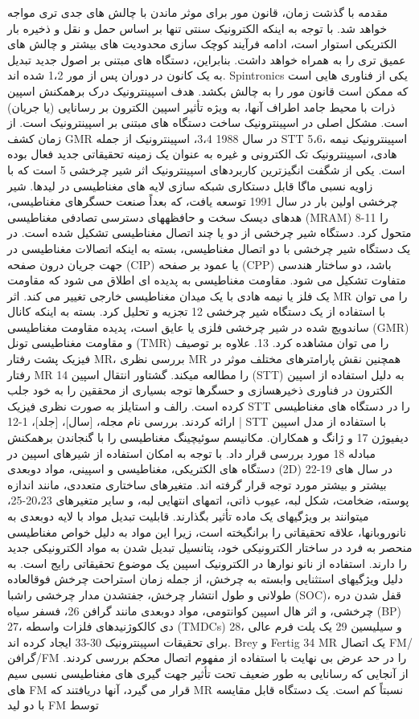 مقدمه با گذشت زمان، قانون مور برای موثر ماندن با چالش های جدی تری مواجه خواهد شد. با توجه به اینکه الکترونیک سنتی تنها بر اساس حمل و نقل و ذخیره بار الکتریکی استوار است، ادامه فرآیند کوچک سازی محدودیت های بیشتر و چالش های عمیق تری را به همراه خواهد داشت. بنابراین، دستگاه های مبتنی بر اصول جدید تبدیل به یک کانون در دوران پس از مور 1،2 شده اند. Spintronics یکی از فناوری هایی است که ممکن است قانون مور را به چالش بکشد. هدف اسپینترونیک درک برهمکنش اسپین ذرات با محیط جامد اطراف آنها، به ویژه تأثیر اسپین الکترون بر رسانایی (یا جریان) است. مشکل اصلی در اسپینترونیک ساخت دستگاه های مبتنی بر اسپینترونیک است. از زمان کشف GMR در سال 1988 3،4، اسپینترونیک از جمله STT 5،6، اسپینترونیک نیمه هادی، اسپینترونیک تک الکترونی و غیره به عنوان یک زمینه تحقیقاتی جدید فعال بوده است. یکی از شگفت انگیزترین کاربردهای اسپینترونیک اثر شیر چرخشی 5 است که با زاویه نسبی ماگا قابل دستکاری شبکه سازی لایه های مغناطیسی در لیدها. شیر چرخشی اولین بار در سال 1991 توسعه یافت، که بعداً صنعت حسگرهای مغناطیسی، هدهای دیسک سخت و حافظههای دسترسی تصادفی مغناطیسی (MRAM) 8-11 را متحول کرد. دستگاه شیر چرخشی از دو یا چند اتصال مغناطیسی تشکیل شده است. در یک دستگاه شیر چرخشی با دو اتصال مغناطیسی، بسته به اینکه اتصالات مغناطیسی در جهت جریان درون صفحه (CIP) یا عمود بر صفحه (CPP) باشد، دو ساختار هندسی متفاوت تشکیل می شود. مقاومت مغناطیسی به پدیده ای اطلاق می شود که مقاومت یک فلز یا نیمه هادی با یک میدان مغناطیسی خارجی تغییر می کند. اثر MR را می توان با استفاده از یک دستگاه شیر چرخشی 12 تجزیه و تحلیل کرد. بسته به اینکه کانال ساندویچ شده در شیر چرخشی فلزی یا عایق است، پدیده مقاومت مغناطیسی (GMR) و مقاومت مغناطیسی تونل (TMR) را می توان مشاهده کرد. 13. علاوه بر توصیف فیزیک پشت رفتار MR، بررسی نظری MR همچنین نقش پارامترهای مختلف موثر در رفتار MR 14 را مطالعه میکند. گشتاور انتقال اسپین (STT) به دلیل استفاده از اسپین الکترون در فناوری ذخیرهسازی و حسگرها توجه بسیاری از محققین را به خود جلب کرده است. رالف و استایلز به صورت نظری فیزیک STT را در دستگاه های مغناطیسی ارائه کردند. بررسی نام مجله، [سال]، [جلد]، 1-12 | STT با استفاده از مدل اسپین دیفیوژن 17 و ژانگ و همکاران. مکانیسم سوئیچینگ مغناطیسی را با گنجاندن برهمکنش مبادله 18 مورد بررسی قرار داد. با توجه به امکان استفاده از شیرهای اسپین در دستگاه های الکتریکی، مغناطیسی و اسپینی، مواد دوبعدی (2D) در سال های 19-22 بیشتر و بیشتر مورد توجه قرار گرفته اند. متغیرهای ساختاری متعددی، مانند اندازه پوسته، ضخامت، شکل لبه، عیوب ذاتی، اتمهای انتهایی لبه، و سایر متغیرهای 20،23-25، میتوانند بر ویژگیهای یک ماده تأثیر بگذارند. قابلیت تبدیل مواد با لایه دوبعدی به نانوروبانها، علاقه تحقیقاتی را برانگیخته است، زیرا این مواد به دلیل خواص مغناطیسی منحصر به فرد در ساختار الکترونیکی خود، پتانسیل تبدیل شدن به مواد الکترونیکی جدید را دارند. استفاده از نانو نوارها در الکترونیک اسپین یک موضوع تحقیقاتی رایج است. به دلیل ویژگیهای استثنایی وابسته به چرخش، از جمله زمان استراحت چرخش فوقالعاده طولانی و طول انتشار چرخش، جفتشدن مدار چرخشی راشبا (SOC)، قفل شدن دره چرخشی، و اثر هال اسپین کوانتومی، مواد دوبعدی مانند گرافن 26، فسفر سیاه (BP) 27، دی کالکوژنیدهای فلزات واسطه (TMDCs) 28، و سیلیسین 29 یک پلت فرم عالی برای تحقیقات اسپینترونیک 30-33 ایجاد کرده اند. Brey و Fertig 34 MR یک اتصال FM/گرافن/FM را در حد عرض بی نهایت با استفاده از مفهوم اتصال محکم بررسی کردند. از آنجایی که رسانایی به طور ضعیف تحت تأثیر جهت گیری های مغناطیسی نسبی سیم های FM قرار می گیرد، آنها دریافتند که MR نسبتاً کم است. یک دستگاه قابل مقایسه با دو لید FM توسط 